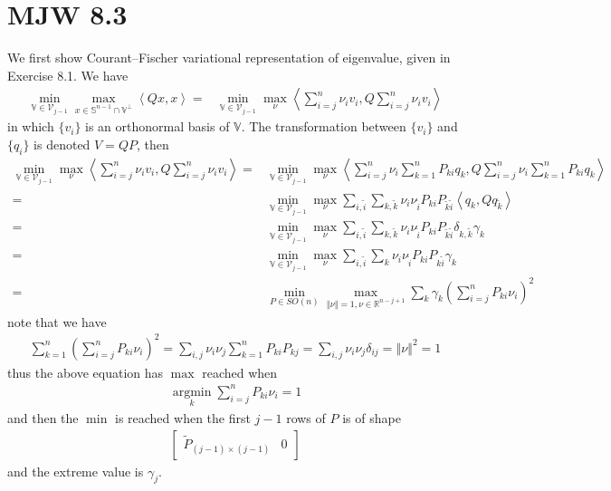 \documentclass[11pt,a4paper]{ctexart}
\numberwithin{equation}{section}%
\begin{document}
\section{MJW 8.3}
We first show Courant–Fischer variational representation of eigenvalue, given in Exercise 8.1. We have
\begin{align*}
    \mathop{ \min }\limits_{\mathbb{V}\in\mathcal{V}_{j-1}}  \mathop{ \max  }\limits_{x\in \mathbb{S}^{n-1} \cap \mathbb{V}^\perp} \left\langle Qx,x \right\rangle  =& \mathop{ \min }\limits_{\mathbb{V}\in\mathcal{V}_{j-1}}  \mathop{ \max  }\limits_{\nu } \left\langle \sum_{i=j}^n \nu _iv_i, Q\sum_{i=j}^n \nu _iv_i  \right\rangle 
\end{align*}
in which $ \{v_i\} $ is an orthonormal basis of $ \mathbb{V} $. The transformation between $ \{v_i\} $ and $ \{q_i\} $ is denoted $ V=QP $, then
\begin{align*}
    \mathop{ \min }\limits_{\mathbb{V}\in\mathcal{V}_{j-1}}  \mathop{ \max  }\limits_{\nu } \left\langle \sum_{i=j}^n \nu _iv_i, Q\sum_{i=j}^n \nu _iv_i  \right\rangle  = & \mathop{ \min }\limits_{\mathbb{V}\in\mathcal{V}_{j-1}}  \mathop{ \max  }\limits_{\nu } \left\langle \sum_{i=j}^n\nu _i \sum_{k=1}^n P_{ki}q_k, Q\sum_{i=j}^n\nu _i \sum_{k=1}^n P_{ki}q_k  \right\rangle  \\
    =& \mathop{ \min }\limits_{\mathbb{V}\in\mathcal{V}_{j-1}}  \mathop{ \max  }\limits_{\nu } \sum_{i,\tilde{i}}\sum_{k,\tilde{k}} \nu _i\nu _{\tilde{i}}P_{ki}P_{\tilde{k}\tilde{i}}\left\langle q_k,Qq_{\tilde{k}} \right\rangle  \\
    =& \mathop{ \min }\limits_{\mathbb{V}\in\mathcal{V}_{j-1}}  \mathop{ \max  }\limits_{\nu } \sum_{i,\tilde{i}}\sum_{k,\tilde{k}} \nu _i\nu _{\tilde{i}}P_{ki}P_{\tilde{k}\tilde{i}} \delta _{k,\tilde{k}}\gamma _k  \\
    =& \mathop{ \min }\limits_{\mathbb{V}\in\mathcal{V}_{j-1}}  \mathop{ \max  }\limits_{\nu } \sum_{i,\tilde{i}} \sum_k \nu _i\nu _{\tilde{i}}P_{ki}P_{k\tilde{i}} \gamma _k  \\
    =& \mathop{ \min }\limits_{P\in SO(n)}  \mathop{ \max  }\limits_{\left\Vert \nu \right\Vert =1, \nu\in \mathbb{R}^{n-j+1} } \sum_{k} \gamma _k (\sum_{i=j}^n P_{ki} \nu _i)^2  
\end{align*}
note that we have 
\begin{align*}
    \sum_{k=1}^n(\sum_{i=j}^n P_{ki} \nu _i)^2 = \sum_{i,j} \nu _i\nu _j\sum_{k=1}^n P_{ki}P_{kj} = \sum_{i,j} \nu _i\nu _j\delta _{ij} = \left\Vert \nu  \right\Vert ^2 = 1
\end{align*}
thus the above equation has $ \max $ reached when 
\begin{align*}
    \mathop{ \arg\min }\limits_{k} \sum_{i=j}^n P_{ki} \nu _i =1
\end{align*}
and then the $ \min $ is reached when the first $ j-1 $ rows of $ P $ is of shape
\begin{align*}
    \begin{bmatrix}
        \tilde{P}_{(j-1)\times(j-1)} & 0 
    \end{bmatrix} 
\end{align*}
and the extreme value is $ \gamma _j $.
\end{document}
